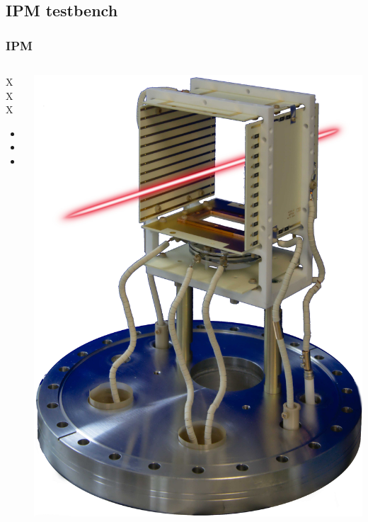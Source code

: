 \subsection{IPM testbench}
\begin{frame}
  \frametitle{IPM}
  \begin{columns}
    \begin{column}{0.45\textwidth}
      \begin{block}{XXX}
        \begin{itemize}
          \item
          \item
          \item
        \end{itemize}
      \end{block}
    \end{column}
    \begin{column}{0.45\textwidth}
      \includegraphics[width=\textwidth]{04_Test/fig/fig000_IPM_photo2}
    \end{column}
  \end{columns}
\end{frame}

